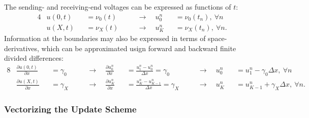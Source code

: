 \documentclass{article}
\begin{document}
The sending- and receiving-end voltages can be expressed as functions of $t$:
\begin{alignat*}{4}
   & u \left(0,t\right) &&= \nu_{0} \left(t\right)
   &&\quad\longrightarrow\quad
   u_{0}^{n} &&= \nu_{0} \left(t_n\right),\ \forall n \\
   & u \left(X,t\right) &&= \nu_{X} \left(t\right)
   &&\quad\longrightarrow\quad
   u_{K}^{n} &&= \nu_{X} \left(t_n\right),\ \forall n.
\end{alignat*}
Information at the boundaries may also be expressed in terms of space-derivatives,
which can be approximated usign forward and backward finite divided differences:
\begin{alignat*}{8}
   & \frac{\partial u \left(0,t\right)}{\partial x} &&= \gamma_{0}
   &&\quad\longrightarrow\quad
   \frac{\partial u_{0}^{n}}{\partial x} &&= \frac{u_{1}^{n} - u_{0}^{n}}{\Delta x} = \gamma_{0}
   &&\quad\longrightarrow\quad
   u_{0}^{n} &&= u_{1}^{n} - \gamma_{0} \Delta x,\ \forall n \\
   & \frac{\partial u \left(X,t\right)}{\partial x} &&= \gamma_{X}
   &&\quad\longrightarrow\quad
   \frac{\partial u_{K}^{n}}{\partial x} &&= \frac{u_{K}^{n} - u_{K-1}^{n}}{\Delta x} = \gamma_{X}
   &&\quad\longrightarrow\quad
   u_{K}^{n} &&= u_{K-1}^{n} + \gamma_{X} \Delta x,\ \forall n.
\end{alignat*}

\subsubsection{Vectorizing the Update Scheme}
\label{subsubsec: Vectorizing the Update Scheme}
\end{document}
